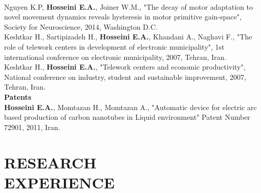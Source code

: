 \documentclass[margin, 10pt]{res}
\begin{document}
\begin{resume}
\vspace{2.5mm} \\
Nguyen K.P, { \bf Hosseini E.A.}, Joiner W.M., "The decay of motor adaptation to novel
movement dynamics reveals hysteresis in motor primitive gain-space", Society for Neuroscience, 2014, Washington D.C. \
\vspace{2.5mm} \\
Keshtkar H., Sartipizadeh H.,{ \bf Hosseini E.A.}, Khandani A., Naghavi F., "The role of telework centers in development of electronic municipality", 1st international conference on electronic municipality, 2007, Tehran, Iran. \
\vspace{2.5mm} \\
Keshtkar H.,{ \bf Hosseini E.A.}, "Telework centers and economic productivity",  National conference on industry, student and sustainable improvement, 2007, Tehran,
Iran. \
\vspace{5mm} \\
 \textbf{Patents}  
 \vspace{2.5mm} \\
{ \bf Hosseini E.A.}, Momtazan H., Momtazan A., "Automatic device for electric arc based production of carbon nanotubes in Liquid environment" Patent Number 72901, 2011, Iran. \

\section { RESEARCH  \\ EXPERIENCE} 


\end{resume}
\end{document}
